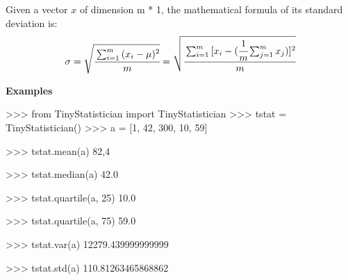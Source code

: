 \documentclass[]{article}
\newenvironment{Shaded}{\begin{snugshade}}{\end{snugshade}}
\newcommand{\DecValTok}[1]{\textcolor[rgb]{0.96,0.45,0.00}{#1}}
\newcommand{\FloatTok}[1]{\textcolor[rgb]{0.96,0.45,0.00}{#1}}
\newcommand{\ImportTok}[1]{\textcolor[rgb]{0.15,0.68,0.38}{#1}}
\newcommand{\NormalTok}[1]{\textcolor[rgb]{0.81,0.81,0.76}{#1}}
\newcommand{\OperatorTok}[1]{\textcolor[rgb]{0.81,0.81,0.76}{#1}}
\begin{document}
Given a vector \(x\) of dimension m * 1, the mathematical formula of its
standard deviation is: \large \[
\sigma = \sqrt{\cfrac{\sum_{i = 1}^{m}{(x_i - \mu)^2}}{m}} = \sqrt{\cfrac{\sum_{i = 1}^{m}{[x_i - (\cfrac{1}{m}\sum_{j = 1}^{m}{x_j}})]^2}{m}}
\] \normalsize

\textbf{Examples}

\begin{Shaded}
\begin{Highlighting}[]
\OperatorTok{>>>} \ImportTok{from}\NormalTok{ TinyStatistician }\ImportTok{import}\NormalTok{ TinyStatistician}
\OperatorTok{>>>}\NormalTok{ tstat }\OperatorTok{=}\NormalTok{ TinyStatistician()}
\OperatorTok{>>>}\NormalTok{ a }\OperatorTok{=}\NormalTok{ [}\DecValTok{1}\NormalTok{, }\DecValTok{42}\NormalTok{, }\DecValTok{300}\NormalTok{, }\DecValTok{10}\NormalTok{, }\DecValTok{59}\NormalTok{]}

\OperatorTok{>>>}\NormalTok{ tstat.mean(a)}
\DecValTok{82}\NormalTok{,}\DecValTok{4}

\OperatorTok{>>>}\NormalTok{ tstat.median(a)}
\FloatTok{42.0}

\OperatorTok{>>>}\NormalTok{ tstat.quartile(a, }\DecValTok{25}\NormalTok{)}
\FloatTok{10.0}

\OperatorTok{>>>}\NormalTok{ tstat.quartile(a, }\DecValTok{75}\NormalTok{)}
\FloatTok{59.0}

\OperatorTok{>>>}\NormalTok{ tstat.var(a)}
\FloatTok{12279.439999999999}

\OperatorTok{>>>}\NormalTok{ tstat.std(a)}
\FloatTok{110.81263465868862}
\end{Highlighting}
\end{Shaded}

\clearpage
\end{document}
